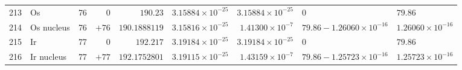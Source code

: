 {\begin{tabular}{@{}r l r r r r r l l@{}}
213 & Os & 76 & $0$ & $190.23$ & $3.15884{\times}10^{-25}$ & $3.15884{\times}10^{-25}$ & $0$ & $79.86$ \\
214 & Os nucleus & 76 & $+76$ & $190.1888119$ & $3.15816{\times}10^{-25}$ & $1.41300{\times}10^{-7}$ & $79.86 - 1.26060{\times}10^{-16}$ & $1.26060{\times}10^{-16}$ \\
215 & Ir & 77 & $0$ & $192.217$ & $3.19184{\times}10^{-25}$ & $3.19184{\times}10^{-25}$ & $0$ & $79.86$ \\
216 & Ir nucleus & 77 & $+77$ & $192.1752801$ & $3.19115{\times}10^{-25}$ & $1.43159{\times}10^{-7}$ & $79.86 - 1.25723{\times}10^{-16}$ & $1.25723{\times}10^{-16}$ \\
\bottomrule
\end{tabular}}
\endgroup
\clearpage
\begingroup\scriptsize\setlength{\extrarowheight}{0pt}\setlength{\tabcolsep}{3.2pt}\renewcommand{\arraystretch}{1.02}
